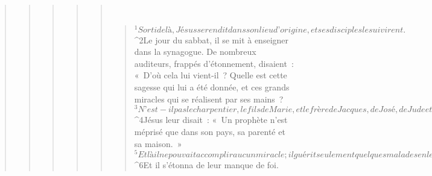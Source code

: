 \begin{verse}
\begin{verse}
\begin{verse}
\begin{verse}
\begin{verse}
         
      \bchapter{}
      \begin{verse}
${}^{1}Sorti de là, Jésus se rendit dans son lieu d’origine, et ses disciples le suivirent. 
${}^{2}Le jour du sabbat, il se mit à enseigner dans la synagogue. De nombreux auditeurs, frappés d’étonnement, disaient : « D’où cela lui vient-il ? Quelle est cette sagesse qui lui a été donnée, et ces grands miracles qui se réalisent par ses mains ? 
${}^{3}N’est-il pas le charpentier, le fils de Marie, et le frère de Jacques, de José, de Jude et de Simon ? Ses sœurs ne sont-elles pas ici chez nous ? » Et ils étaient profondément choqués à son sujet. 
${}^{4}Jésus leur disait : « Un prophète n’est méprisé que dans son pays, sa parenté et sa maison. » 
${}^{5}Et là il ne pouvait accomplir aucun miracle ; il guérit seulement quelques malades en leur imposant les mains. 
${}^{6}Et il s’étonna de leur manque de foi.
      

\end{verse}
\end{verse}
\end{verse}
\end{verse}
\end{verse}
\end{verse}
